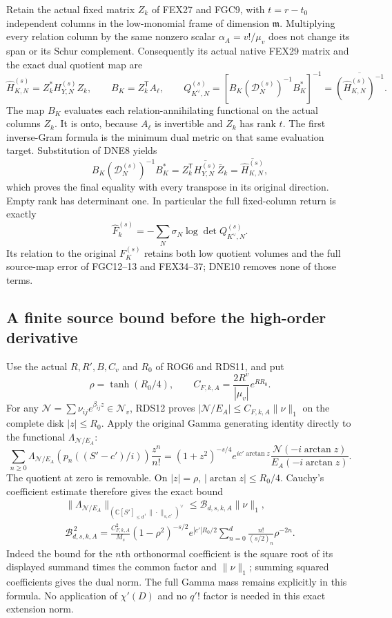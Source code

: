 \documentclass[11pt,a4paper]{article}
\begin{document}
Retain the actual fixed matrix $Z_k$ of FEX27 and FGC9,
with $t=r-t_0$ independent columns in the low-monomial
frame of dimension $\mathfrak m$. Multiplying every
relation column by the same nonzero scalar
$\alpha_A=v!/\mu_v$ does not change its span or its
Schur complement. Consequently its actual native
FEX29 matrix and the exact dual quotient map are
\[
 \widehat H_{K,N}^{(s)}=Z_k^*H_{Y,N}^{(s)}Z_k,\qquad
 B_K=Z_k^{\mathsf T}A_\ell,\qquad
 Q_{K^\vee,N}^{(s)}
 =\left[B_K(\mathcal D_N^{(s)})^{-1}B_K^*\right]^{-1}
 =\overline{(\widehat H_{K,N}^{(s)})^{-1}}.
 \tag{DNE9}
\]
The map $B_K$ evaluates each relation-annihilating functional
on the actual columns $Z_k$. It is onto, because $A_\ell$
is invertible and $Z_k$ has rank $t$. The first inverse-Gram
formula is the minimum dual metric on that same evaluation
target. Substitution of DNE8 yields
\[
 B_K(\mathcal D_N^{(s)})^{-1}B_K^*
 =Z_k^{\mathsf T}\overline{H_{Y,N}^{(s)}}\bar Z_k
 =\overline{\widehat H_{K,N}^{(s)}},
\]
which proves the final equality with every transpose in
its original direction. Empty rank has determinant one.
In particular the full fixed-column return is exactly
\[
 \widehat F_k^{(s)}
 =-\sum_N\sigma_N\log\det Q_{K^\vee,N}^{(s)}.
 \tag{DNE10}
\]
Its relation to the original $F_K^{(s)}$ retains both low
quotient volumes and the full source-map error of FGC12--13
and FEX34--37; DNE10 removes none of those terms.

\subsection{A finite source bound before the high-order derivative}

Use the actual $R,R',B,C_v$ and $R_0$ of ROG6 and RDS11,
and put
\[
 \rho=\tanh(R_0/4),\qquad
 C_{F,k,A}=\frac{2R^v}{|\mu_v|}e^{RR_0}.
 \tag{DNE11}
\]
For any $\mathcal N=\sum\nu_{ij}e^{\beta_{ij}z}
\in\mathscr N_v$, RDS12 proves
$|\mathcal N/E_A|\le C_{F,k,A}\|\nu\|_1$
on the complete disk $|z|\le R_0$.
Apply the original Gamma generating identity directly to
the functional $\Lambda_{\mathcal N/E_A}$:
\[
 \sum_{n\ge0}\Lambda_{\mathcal N/E_A}
          \left(p_n((S'-c')/i)\right)\frac{z^n}{n!}
 =(1+z^2)^{-s/4}e^{ic'\arctan z}
                       \frac{\mathcal N(-i\arctan z)}
                            {E_A(-i\arctan z)}.
 \tag{DNE12}
\]
The quotient at zero is removable. On $|z|=\rho$,
$|\arctan z|\le R_0/4$.
Cauchy's coefficient estimate therefore gives the exact bound
\[
 \begin{gathered}
 \|\Lambda_{\mathcal N/E_A}\|_
             {(\mathbb C[S']_{\le d},\|\cdot\|_{s,c'})^\vee}
       \le \mathcal B_{d,s,k,A}\|\nu\|_1,\\
 \mathcal B_{d,s,k,A}^{\,2}
 =\frac{C_{F,k,A}^2}{M_s}
    (1-\rho^2)^{-s/2}e^{|c'|R_0/2}
       \sum_{n=0}^d\frac{n!}{(s/2)_n}\rho^{-2n}.
 \end{gathered}\tag{DNE13}
\]
Indeed the bound for the $n$th orthonormal coefficient is
the square root of its displayed summand times the common
factor and $\|\nu\|_1$; summing squared coefficients gives
the dual norm. The full Gamma mass remains explicitly in
this formula. No application of $\chi'(D)$ and no
$q'!$ factor is needed in this exact extension norm.
\end{document}
